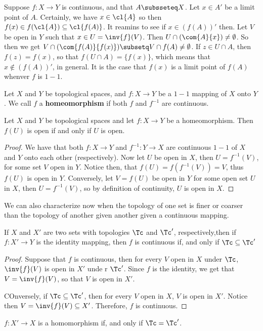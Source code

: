 \begin{example}\label{1.20}
    Suppose $f:X \rightarrow Y$ is continuous, and that $A \subsseteq X$. Let
    $x \in A'$ be a limit point of $A$. Certainly, we have $x \in \cl{A}$ so
    then $f(x) \in f(\cl{A}) \subseteq \cl{f(A)}$. It reamins to see if $x \in
    (f(A))'$ then. Let $V$ be open in  $Y$ such that  $x \in U=\inv{f}(V)$.
    Then $U \cap (\com{A}{x}) \neq \emptyset$. So then we get $V \cap
    (\com{f(A)}{f(x)}) \subsetq V \cap f(A) \neq \emptyset$. If $z \in U \cap A$,
    then  $f(z)=f(x)$, so that $f(U \cap A)=\{f(x)\}$, which means that $x
    \notin (f(A))'$, in general. It is the case that $f(x)$ is a limit point of
    $f(A)$ whenver $f$ is  $1-1$.
\end{example}

\begin{definition}
    Let $X$ and  $Y$ be topological spaces, and  $f:X \rightarrow Y$ be a $1-1$ mapping of  $X$ onto
    $Y$. We call  $f$ a \textbf{homeomorphism} if both $f$ and  $f^{-1}$ are continuous.
\end{definition}

\begin{lemma}\label{1.7.2}
    Let $X$ and  $Y$ be topological spaces and let $f:X \rightarrow Y$ be a homeomorphism. Then
    $f(U)$ is open if and only if $U$ is open.
\end{lemma}
\begin{proof}
    We have that both $f:X \rightarrow Y$ and  $f^{-1}:Y \rightarrow X$ are continuous $1-1$ of $X$
    and  $Y$ onto each other  (respectively). Now let $U$ be open in  $X$, then $U=f^{-1}(V)$, for
    some set  $V$ open in $Y$. Notice then, that $f(U)=f(f^{-1}(V))=V$, thus $f(U)$ is open in $Y$.
    Conversely, let $V=f(U)$ be open in $Y$ for some open set  $U$ in  $X$, then  $U=f^{-1}(V)$, so
    by definition of continuity, $U$  is open in $X$.
\end{proof}

We can also characterize now when the topology of one set is finer or coarser
than the topology of another given another given a continuous mapping.

\begin{lemma}\label{1.7.3}
    If $X$ and  $X'$ are two sets with topologies  $\Tc$ and  $\Tc'$,
    respectively,then if  $f:X' \rightarrow Y$ is the identity mapping, then $f$
    is continuous if, and only if $\Tc \subseteq \Tc'$
\end{lemma}
\begin{proof}
    Suppose that $f$ is continuous, then for every  $V$ open in  $X$ under
    $\Tc$,  $\inv{f}(V)$ is open in $X'$ unde r $\Tc'$. Since  $f$ is the
    identity, we get that $V=\inv{f}(V)$, so that $V$ is open in  $X'$.

    COnversely, if  $\Tc \subseteq \Tc'$, then for every  $V$ open in  $X$,  $V$
    is open in  $X'$. Notice then  $V=\inv{f}(V) \subseteq X'$. Therefore, $f$
    is continuous.
\end{proof}
\begin{corollary}
    $f:X' \rightarrow X$ is a homomorphism if, and only if $\Tc=\Tc'$.
\end{corollary}

